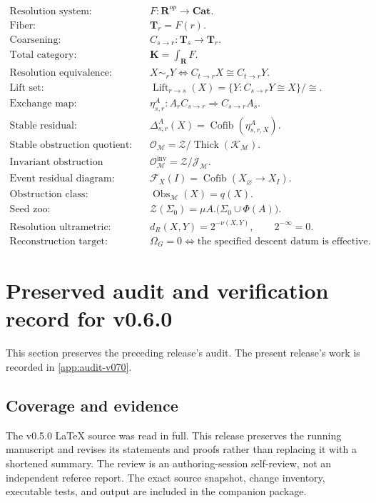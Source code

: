 \documentclass[11pt]{article}
\theoremstyle{definition}
\theoremstyle{remark}
\newcommand{\K}{\mathbf K}
\newcommand{\Rcat}{\mathbf R}
\newcommand{\Tcat}{\mathbf T}
\newcommand{\Cat}{\mathbf{Cat}}
\newcommand{\Lift}{\operatorname{Lift}}
\newcommand{\Cofib}{\operatorname{Cofib}}
\newcommand{\Obs}{\operatorname{Obs}}
\newcommand{\Zoo}{\mathcal Z}
\newcommand{\Seeds}{\Sigma}
\begin{document}
\begin{align*}
\text{Resolution system:}\quad
&F:\Rcat^{op}\to\Cat.\\[0.4em]
\text{Fiber:}\quad
&\Tcat_r=F(r).\\[0.4em]
\text{Coarsening:}\quad
&C_{s\to r}:\Tcat_s\to\Tcat_r.\\[0.4em]
\text{Total category:}\quad
&\K=\int_{\Rcat}F.\\[0.4em]
\text{Resolution equivalence:}\quad
&X\sim_rY\iff C_{t\to r}X\cong C_{t\to r}Y.\\[0.4em]
\text{Lift set:}\quad
&\Lift_{r\to s}(X)=\{Y:C_{s\to r}Y\cong X\}/\cong.\\[0.4em]
\text{Exchange map:}\quad
&\eta^A_{s,r}:A_rC_{s\to r}\Rightarrow C_{s\to r}A_s.\\[0.4em]
\text{Stable residual:}\quad
&\Delta^A_{s,r}(X)=\Cofib(\eta^A_{s,r,X}).\\[0.4em]
\text{Stable obstruction quotient:}\quad
&\mathcal O_{\mathscr M}=\mathcal Z/\operatorname{Thick}(\mathcal K_{\mathscr M}).\\[0.4em]
\text{Invariant obstruction quotient:}\quad
&\mathcal O^{\mathrm{inv}}_{\mathscr M}=\mathcal Z/\mathcal J_{\mathscr M}.\\[0.4em]
\text{Event residual diagram:}\quad
&\mathcal F_X(I)=\Cofib(X_{\varnothing}\to X_I).\\[0.4em]
\text{Obstruction class:}\quad
&\Obs_{\mathscr M}(X)=q(X).\\[0.4em]
\text{Seed zoo:}\quad
&\Zoo(\Seeds_0)=\mu A.\bigl(\Seeds_0\cup\Phi(A)\bigr).\\[0.4em]
\text{Resolution ultrametric:}\quad
&d_R(X,Y)=2^{-\nu(X,Y)},\qquad 2^{-\infty}=0.\\[0.4em]
\text{Reconstruction target:}\quad
&\Omega_G=0\iff\text{the specified descent datum is effective}.
\end{align*}


\section{Preserved audit and verification record for v0.6.0}\label{app:audit}

This section preserves the preceding release's audit. The present release's work is recorded in \cref{app:audit-v070}.

\subsection{Coverage and evidence}
The v0.5.0 LaTeX source was read in full. This release preserves the running manuscript and revises its statements and proofs rather than replacing it with a shortened summary. The review is an authoring-session self-review, not an independent referee report. The exact source snapshot, change inventory, executable tests, and output are included in the companion package.
\end{document}

